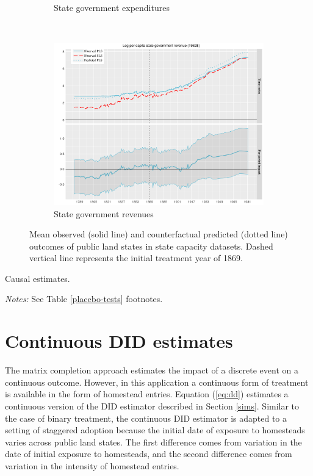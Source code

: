 \documentclass[12pt]{article}
\begin{document}
\begin{figure}[htbp]
\begin{subfigure}[t]{0.48\textwidth}
		\caption{State government expenditures}
	\end{subfigure}
	~ 
	\begin{subfigure}[t]{0.48\textwidth}
		\centering
		\includegraphics[width=\textwidth]{plots/mc-rev-pc.png}
		\caption{State government revenues}
	\end{subfigure}
	\caption{Mean observed (solid line) and counterfactual predicted (dotted line) outcomes of public land states in state capacity datasets. Dashed vertical line represents the initial treatment year of 1869. \label{mc-estimates}} 
\end{figure}

\begin{table}[htbp]
	\captionsetup{font=normalsize}
	\caption{Causal estimates.\label{mc-estimates}}
	\begin{center}
		
	\end{center}
\hspace{20mm}	\footnotesize{\emph{Notes:} See Table \ref{placebo-tests} footnotes.}
\end{table}

\section{Continuous DID estimates} \label{DID}

The matrix completion approach estimates the impact of a discrete event on a continuous outcome. However, in this application a continuous form of treatment is available in the form of homestead entries. Equation (\ref{eq:dd}) estimates a continuous version of the DID estimator described in Section \ref{sims}. Similar to the case of binary treatment, the continuous DID estimator is adapted to a setting of staggered adoption because the initial date of exposure to homesteads varies across public land states. The first difference comes from variation in the date of initial exposure to homesteads, and the second difference comes from variation in the intensity of homestead entries.
\end{document}
